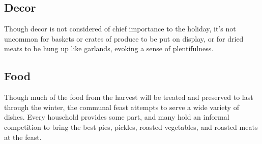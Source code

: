 \documentclass[10pt,a4paper,twoside,bg=print,twocolumn,openany,nodeprecatedcode]{dndbook}
\begin{document}
\subsection{Decor}
Though decor is not considered of chief importance to the holiday, it's not uncommon for baskets or crates of produce to be put on display, or for dried meats to be hung up like garlands, evoking a sense of plentifulness.
\subsection{Food}
Though much of the food from the harvest will be treated and preserved to last through the winter, the communal feast attempts to serve a wide variety of dishes. Every household provides some part, and many hold an informal competition to bring the best pies, pickles, roasted vegetables, and roasted meats at the feast.
\end{document}
